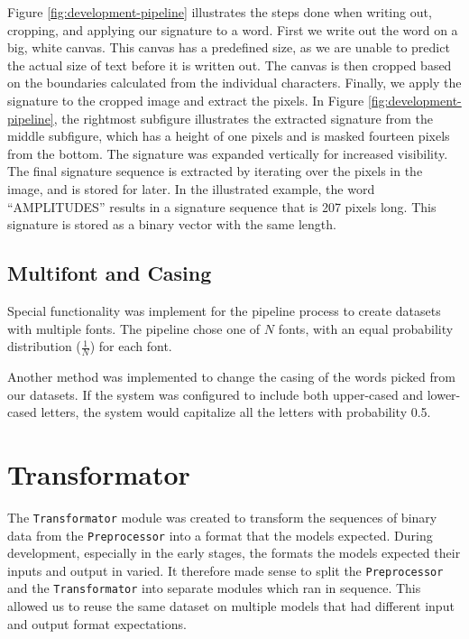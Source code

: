 Figure \ref{fig:development-pipeline} illustrates the steps done when writing out, cropping, and applying our signature to a word. First we write out the word on a big, white canvas. This canvas has a predefined size, as we are unable to predict the actual size of text before it is written out. The canvas is then cropped based on the boundaries calculated from the individual characters. Finally, we apply the signature to the cropped image and extract the pixels. In Figure \ref{fig:development-pipeline}, the rightmost subfigure illustrates the extracted signature from the middle subfigure, which has a height of one pixels and is masked fourteen pixels from the bottom. The signature was expanded vertically for increased visibility. The final signature sequence is extracted by iterating over the pixels in the image, and is stored for later. In the illustrated example, the word ``AMPLITUDES'' results in a signature sequence that is 207 pixels long. This signature is stored as a binary vector with the same length.

\subsection{Multifont and Casing}
Special functionality was implement for the pipeline process to create datasets with multiple fonts. The pipeline chose one of \(N\) fonts, with an equal probability distribution (\(\frac{1}{N}\)) for each font.

Another method was implemented to change the casing of the words picked from our datasets. If the system was configured to include both upper-cased and lower-cased letters, the system would capitalize all the letters with probability 0.5.


\section{Transformator}
\label{sec:transformator}
The {\tt Transformator} module was created to transform the sequences of binary data from the {\tt Preprocessor} into a format that the models expected. During development, especially in the early stages, the formats the models expected their inputs and output in varied. It therefore made sense to split the {\tt Preprocessor} and the {\tt Transformator} into separate modules which ran in sequence. This allowed us to reuse the same dataset on multiple models that had different input and output format expectations.

